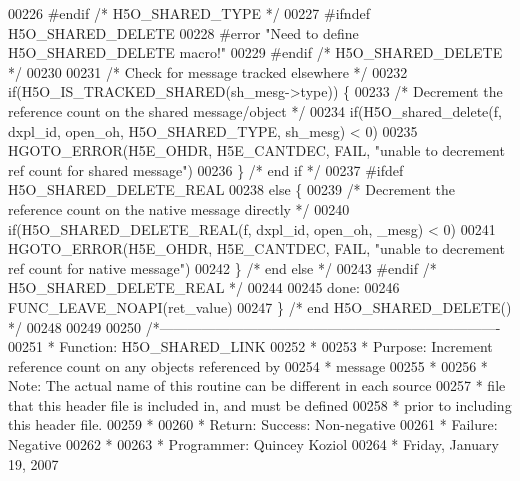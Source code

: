 \begin{DoxyCode}
00226 \textcolor{preprocessor}{#endif }\textcolor{comment}{/* H5O\_SHARED\_TYPE */}\textcolor{preprocessor}{}
00227 \textcolor{preprocessor}{#ifndef H5O\_SHARED\_DELETE}
00228 \textcolor{preprocessor}{#error "Need to define H5O\_SHARED\_DELETE macro!"}
00229 \textcolor{preprocessor}{#endif }\textcolor{comment}{/* H5O\_SHARED\_DELETE */}\textcolor{preprocessor}{}
00230 
00231     \textcolor{comment}{/* Check for message tracked elsewhere */}
00232     \textcolor{keywordflow}{if}(H5O\_IS\_TRACKED\_SHARED(sh\_mesg->type)) \{
00233         \textcolor{comment}{/* Decrement the reference count on the shared message/object */}
00234         \textcolor{keywordflow}{if}(H5O\_shared\_delete(f, dxpl\_id, open\_oh, H5O\_SHARED\_TYPE, sh\_mesg) < 0)
00235         HGOTO\_ERROR(H5E\_OHDR, H5E\_CANTDEC, FAIL, \textcolor{stringliteral}{"unable to decrement ref count for shared message"})
00236     \} \textcolor{comment}{/* end if */}
00237 \textcolor{preprocessor}{#ifdef H5O\_SHARED\_DELETE\_REAL}
00238     \textcolor{keywordflow}{else} \{
00239         \textcolor{comment}{/* Decrement the reference count on the native message directly */}
00240         \textcolor{keywordflow}{if}(H5O\_SHARED\_DELETE\_REAL(f, dxpl\_id, open\_oh, \_mesg) < 0)
00241         HGOTO\_ERROR(H5E\_OHDR, H5E\_CANTDEC, FAIL, \textcolor{stringliteral}{"unable to decrement ref count for native message"})
00242     \} \textcolor{comment}{/* end else */}
00243 \textcolor{preprocessor}{#endif }\textcolor{comment}{/* H5O\_SHARED\_DELETE\_REAL */}\textcolor{preprocessor}{}
00244 
00245 done:
00246     FUNC\_LEAVE\_NOAPI(ret\_value)
00247 \} \textcolor{comment}{/* end H5O\_SHARED\_DELETE() */}
00248 
00249 
00250 \textcolor{comment}{/*-------------------------------------------------------------------------}
00251 \textcolor{comment}{ * Function:    H5O\_SHARED\_LINK}
00252 \textcolor{comment}{ *}
00253 \textcolor{comment}{ * Purpose:     Increment reference count on any objects referenced by}
00254 \textcolor{comment}{ *              message}
00255 \textcolor{comment}{ *}
00256 \textcolor{comment}{ * Note:    The actual name of this routine can be different in each source}
00257 \textcolor{comment}{ *      file that this header file is included in, and must be defined}
00258 \textcolor{comment}{ *      prior to including this header file.}
00259 \textcolor{comment}{ *}
00260 \textcolor{comment}{ * Return:  Success:    Non-negative}
00261 \textcolor{comment}{ *      Failure:    Negative}
00262 \textcolor{comment}{ *}
00263 \textcolor{comment}{ * Programmer:  Quincey Koziol}
00264 \textcolor{comment}{ *              Friday, January 19, 2007}

\end{DoxyCode}
